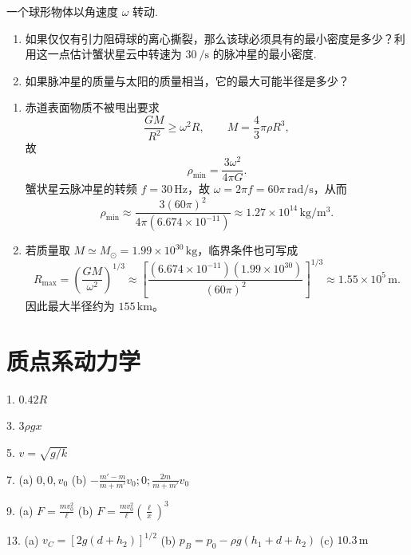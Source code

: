 \begin{exercise}\label{ex:4.18}
一个球形物体以角速度 $\omega$ 转动.
\begin{enumerate}
  \item[(a)] 如果仅仅有引力阻碍球的离心撕裂，那么该球必须具有的最小密度是多少？利用这一点估计蟹状星云中转速为 $30 \ \mathrm{/s}$ 的脉冲星的最小密度.
  \item[(b)] 如果脉冲星的质量与太阳的质量相当，它的最大可能半径是多少？
\end{enumerate}
\end{exercise}
\begin{solution}
\begin{enumerate}
\item[(a)] 赤道表面物质不被甩出要求
\[
\frac{GM}{R^2}\ge \omega^2R,\qquad M=\frac43\pi\rho R^3,
\]
故
\[
\boxed{\rho_{\min}=\frac{3\omega^2}{4\pi G}}.
\]
蟹状星云脉冲星的转频 $f=30\,\mathrm{Hz}$，故
$\omega=2\pi f=60\pi\,\mathrm{rad/s}$，从而
\[
\rho_{\min}\approx
\frac{3(60\pi)^2}{4\pi(6.674\times10^{-11})}
\approx1.27\times10^{14}\,\mathrm{kg/m^3}.
\]

\item[(b)] 若质量取 $M\simeq M_\odot=1.99\times10^{30}\,\mathrm{kg}$，临界条件也可写成
\[
\boxed{R_{\max}=\left(\frac{GM}{\omega^2}\right)^{1/3}}
\approx\left[\frac{(6.674\times10^{-11})(1.99\times10^{30})}{(60\pi)^2}\right]^{1/3}
\approx1.55\times10^5\,\mathrm m.
\]
因此最大半径约为 $155\,\mathrm{km}$。
\end{enumerate}
\end{solution}

\chapter{质点系动力学}

\begin{oddanswers}
1. $0.42R$

3. $3\rho gx$

5. $v = \sqrt{g/k}$

7. (a) $0, 0, v_0$
(b) $-\frac{m' - m}{m + m'}v_0 ; 0; \frac{2m}{m + m'}v_0$

9. (a) $F = \frac{mv_0^2}{\ell}$
(b) $F = \frac{mv_0^2}{\ell}\left(\frac{\ell}{x}\right)^3$

13. (a) $v_C = [2g(d + h_2)]^{1/2}$
(b) $p_B = p_0 - \rho g(h_1 + d + h_2)$
(c) $10.3\,\mathrm{m}$
\end{oddanswers}

